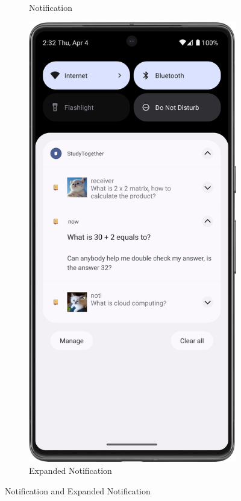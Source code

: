 \begin{figure}[H]
\begin{subfigure}[b]{0.5\textwidth}
    \caption{Notification}
    \label{fig:notification}
  \end{subfigure}
  \hfill
  \begin{subfigure}[b]{0.5\textwidth}
    \includegraphics[width=\textwidth]{Figures/Product_Images/Notification/expand_notification.png}
    \caption{Expanded Notification}
    \label{fig:expand_notification}
  \end{subfigure}
  \caption{Notification and Expanded Notification}
\end{figure}

